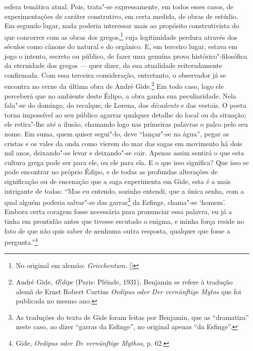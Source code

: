 esfera temática atual. Pois, trata"-se expressamente, em todos esses
casos, de experimentações de caráter construtivo, em certa medida, de
obras de estúdio. Em segundo lugar, nada poderia
interessar mais ao propósito construtivista do que concorrer com as obras
dos gregos,\footnote{No original em alemão: \emph{Griechentum}. []} cuja legitimidade perdura através dos
séculos como cânone do natural e do orgânico. E, em terceiro lugar,
estava em jogo o intento, secreto ou público, de fazer uma genuína prova
histórico"-filosófica da eternidade dos gregos --- quer dizer, da sua
atualidade reiteradamente confirmada. Com essa terceira consideração,
entretanto, o observador já se encontra no cerne da última obra de André
Gide.\footnote{André Gide, \emph{\OE dipe} (Paris: Pléiade, 1931).
  Benjamin se refere à tradução alemã de Ernst Robert Curtius
  \emph{Oedipus oder Der vernünftige Mytos} que foi publicada no mesmo
  ano. \versal{[N.~T.]}} Em todo caso, logo ele perceberá que no ambiente deste Édipo, a
obra ganha sua peculiaridade. Nela fala"-se do domingo, do recalque, de
Lorena, dos \emph{décadents} e das vestais. O poeta torna
impossível ao seu público agarrar qualquer detalhe do local ou da
situação; ele retira"-lhe até a ilusão, chamando logo nas primeiras
palavras o palco pelo seu nome. Em suma, quem quiser segui"-lo, deve
``lançar"-se na água'', pegar as cristas e os vales da onda como vierem
do mar das sagas em movimento há dois mil anos, deixando"-se levar e
deixando"-se cair. Apenas assim sentirá o que esta cultura grega pode
ser para ele, ou ele para ela. E o que isso significa? Que
isso se pode encontrar no próprio Édipo, e de todas as profundas alterações de significação ou de
encenação que a saga experimenta em Gide, esta é a mais intrigante de
todas: ``Mas eu entendo, sozinho entendi, que a única senha, com a qual
alguém poderia salvar"-se das garras\footnote{As traduções do texto
  de Gide foram feitas por Benjamin, que as ``dramatiza'' neste caso, ao
  dizer ``garras da Esfinge'', no original apenas ``da Esfinge''. \versal{[N.~O.]}} da
Esfinge, chama"-se `homem'. Embora certa coragem fosse necessária para
pronunciar essa palavra, eu já a tinha em prontidão antes que tivesse
escutado o enigma, e minha força reside no fato de que não quis saber de
nenhuma outra resposta, qualquer que fosse a pergunta.''\footnote{Gide, \emph{Oedipus oder De vernünftige Mythos}, p. 62. \versal{[N.~T.]}}

